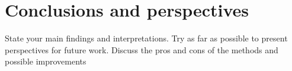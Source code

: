 \documentclass[english, a4paper]{report}
\begin{document}
\section{Conclusions and perspectives}
State your main findings and interpretations. Try as far as possible to present perspectives for future work. Discuss the pros and cons of the methods and possible improvements


\newpage


\end{document}

